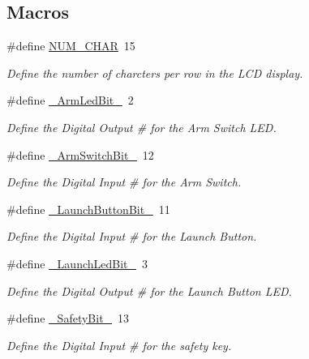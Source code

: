 \subsection*{Macros}
\begin{DoxyCompactItemize}
\item 
\#define \hyperlink{masterPanel_8ino_af22601eb964b24e375a5dad9c85a3a46}{N\+U\+M\+\_\+\+C\+H\+AR}~15
\begin{DoxyCompactList}\small\item\em Define the number of charcters per row in the L\+CD display. \end{DoxyCompactList}\item 
\#define \hyperlink{masterPanel_8ino_abeac387ee946b831a2d5f3ea8efa2cd6}{\+\_\+\+Arm\+Led\+Bit\+\_\+}~2
\begin{DoxyCompactList}\small\item\em Define the Digital Output \# for the Arm Switch L\+ED. \end{DoxyCompactList}\item 
\#define \hyperlink{masterPanel_8ino_aceced00e366c0b2de5b1f6a45e857af2}{\+\_\+\+Arm\+Switch\+Bit\+\_\+}~12
\begin{DoxyCompactList}\small\item\em Define the Digital Input \# for the Arm Switch. \end{DoxyCompactList}\item 
\#define \hyperlink{masterPanel_8ino_a7790df90c3031037ccd5b55d84e32858}{\+\_\+\+Launch\+Button\+Bit\+\_\+}~11
\begin{DoxyCompactList}\small\item\em Define the Digital Input \# for the Launch Button. \end{DoxyCompactList}\item 
\#define \hyperlink{masterPanel_8ino_a556344e1154b17e67f5c8a40e022be29}{\+\_\+\+Launch\+Led\+Bit\+\_\+}~3
\begin{DoxyCompactList}\small\item\em Define the Digital Output \# for the Launch Button L\+ED. \end{DoxyCompactList}\item 
\#define \hyperlink{masterPanel_8ino_a3091b65befbc4ba8ae2a2cd5a0ed50a9}{\+\_\+\+Safety\+Bit\+\_\+}~13
\begin{DoxyCompactList}\small\item\em Define the Digital Input \# for the safety key. \end{DoxyCompactList}\item 

\end{DoxyCompactItemize}
